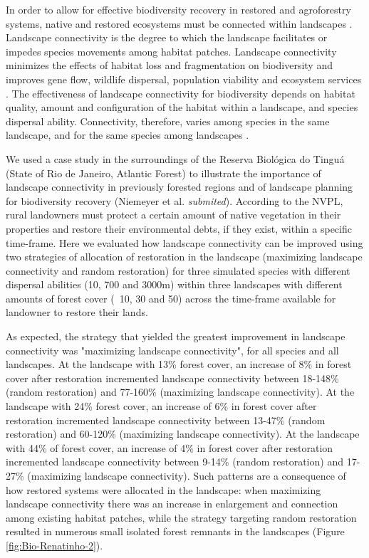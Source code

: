 In order to allow for effective biodiversity recovery in restored and agroforestry systems, native and restored ecosystems must be connected within landscapes \citep{Crouzeilles2014, Crouzeilles2015}. Landscape connectivity is the degree to which the landscape facilitates or impedes species movements among habitat patches. %
Landscape connectivity minimizes the effects of habitat loss and fragmentation on biodiversity and improves gene flow, wildlife dispersal, population viability and ecosystem services \citep{Lindenmayer2006, Galpern2011}. The effectiveness of landscape connectivity for biodiversity depends on habitat quality, amount and configuration of the habitat within a landscape, and species dispersal ability. Connectivity, therefore, varies among species in the same landscape, and for the same species among landscapes \citep{CROUZEILLES2013}. 

We used a case study in the surroundings of the Reserva Biológica do Tinguá (State of Rio de Janeiro, Atlantic Forest) to illustrate the importance of landscape connectivity in previously forested regions and of landscape planning for biodiversity recovery (Niemeyer et al. \textit{submited}). According to the NVPL, rural landowners must protect a certain amount of native vegetation in their properties and restore their environmental debts, if they exist, within a specific time-frame. Here we evaluated how landscape connectivity can be improved using two strategies of allocation of restoration in the landscape (maximizing landscape connectivity and random restoration) for three simulated species with different dispersal abilities (10, 700 and 3000m) within three landscapes with different amounts of forest cover (~10, 30 and 50) across the time-frame available for landowner to restore their lands.
	
As expected, the strategy that yielded the greatest improvement in landscape connectivity was "maximizing landscape connectivity", for all species and all landscapes. At the landscape with 13\% forest cover, an increase of 8\% in forest cover after restoration incremented landscape connectivity between 18-148\% (random restoration) and 77-160\% (maximizing landscape connectivity). At the landscape with 24\% forest cover, an increase of 6\% in forest cover after restoration incremented landscape connectivity between 13-47\% (random restoration) and 60-120\% (maximizing landscape connectivity). At the landscape with 44\% of forest cover, an increase of 4\% in forest cover after restoration incremented landscape connectivity between 9-14\% (random restoration) and 17-27\% (maximizing landscape connectivity). Such patterns are a consequence of how restored systems were allocated in the landscape: when maximizing landscape connectivity there was an increase in enlargement and connection among existing habitat patches, while the strategy targeting random restoration resulted in numerous small isolated forest remnants in the landscapes (Figure \ref{fig:Bio-Renatinho-2}).  \\

